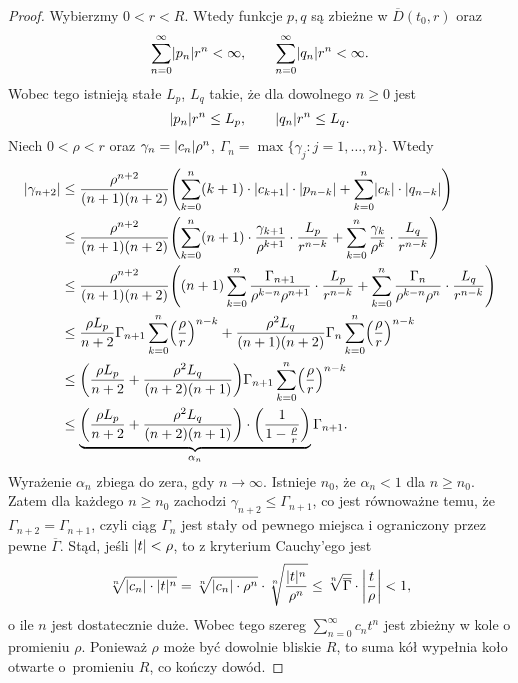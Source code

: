 \begin{proof}
  Wybierzmy $0 < r < R$. Wtedy funkcje $p,q$ są zbieżne w $\overline{D} (t_0,r)$ oraz
%
  \begin{equation*}
    \sum_{n=0}^{\infty} \abs{p_n} r^n < \infty, \qquad \sum_{n=0}^{\infty} \abs{q_n} r^n < \infty.
  \end{equation*}
%
  Wobec tego istnieją stałe $L_p$, $L_q$ takie, że dla dowolnego $n \geq 0$ jest
%
  \begin{equation*}
    \abs{p_n} r^n \leq L_p, \qquad \abs{q_n} r^n \leq L_q.
  \end{equation*}
%
  Niech $0 < \rho < r$ oraz $\gamma_n = \abs{c_n} \rho^n$, $\Gamma_n = \max\{\gamma_j: j = 1,\ldots,n\}$. Wtedy
%
  \begin{align*}
    \abs{\gamma_{n+2}}
    &\leq \frac{\rho^{n+2}}{(n+1)(n+2)} \p*{ \sum_{k = 0}^{n} (k + 1) \cdot \abs{c_{k + 1}} \cdot \abs{p_{n - k}} + 
        \sum_{k = 0}^{n} \abs{c_k} \cdot \abs{q_{n - k}}} \\ 
    &\leq \frac{\rho^{n+2}}{(n+1)(n+2)} \p*{ \sum_{k=0}^{n} (n+1) \cdot \frac{\gamma_{k+1}}{\rho^{k+1}} 
        \cdot \frac{L_p}{r^{n-k}} + \sum_{k=0}^{n} \frac{\gamma_k}{\rho^k} \cdot \frac{L_q}{r^{n-k}} } \\ 
    &\leq \frac{\rho^{n+2}}{(n+1)(n+2)} \p*{ (n+1) \sum_{k=0}^{n} \frac{\Gamma_{n+1}}{\rho^{k-n} \rho^{n+1}} \cdot 
        \frac{L_p}{r^{n-k}} + \sum_{k=0}^{n} \frac{\Gamma_n}{\rho^{k-n}\rho^{n}} \cdot \frac{L_q}{r^{n-k}} } \\
    &\leq \frac{\rho L_p}{n+2} \Gamma_{n+1} \sum_{k=0}^{n} \p*{ \frac{\rho}{r} }^{n-k} +
        \frac{\rho^2 L_q}{(n+1)(n+2)} \Gamma_n \sum_{k=0}^{n} \p*{ \frac{\rho}{r} }^{n-k} \\
    &\leq \p*{ \frac{\rho L_p}{n+2} + \frac{\rho^2 L_q}{(n+2)(n+1)}} \Gamma_{n+1}
        \sum_{k=0}^n \p*{ \frac{\rho}{r} }^{n-k} \\
    &\leq \underbrace{\p*{ \frac{\rho L_p}{n+2} + \frac{\rho^2 L_q}{(n+2)(n+1)}} \cdot
        \p*{\frac{1}{1 - \frac{\rho}{r}}}}_{\alpha_n} \Gamma_{n+1}.
  \end{align*}
%
  Wyrażenie $\alpha_n$ zbiega do zera, gdy $n \to \infty$. Istnieje $n_0$, że $\alpha_n < 1$ dla $n \geq n_0$. Zatem 
  dla każdego $n \geq n_0$ zachodzi $\gamma_{n+2} \leq \Gamma_{n+1}$, co jest równoważne temu, że
  $\Gamma_{n+2} = \Gamma_{n+1}$, czyli ciąg $\Gamma_n$ jest stały od pewnego miejsca i ograniczony przez pewne 
  $\overline{\Gamma}$. Stąd, jeśli $\abs{t} < \rho$, to z kryterium Cauchy'ego jest
%
  \begin{equation*}
    \sqrt[n]{\abs{c_n} \cdot \abs{t}^n} = \sqrt[n]{\abs{c_n} \cdot \rho^n} \cdot 
    \sqrt[n]{\frac{\abs{t}^n}{\rho^n}} \leq \sqrt[n]{\overline{\Gamma}} \cdot \abs*{\frac{t}{\rho}} < 1,
  \end{equation*}
%
  o ile $n$ jest dostatecznie duże. Wobec tego szereg $\sum_{n=0}^{\infty} c_n t^n$ jest zbieżny w kole o promieniu 
  $\rho$. Ponieważ $\rho$ może być dowolnie bliskie $R$, to suma kół wypełnia koło otwarte o~promieniu $R$, co kończy 
  dowód.
\end{proof}
